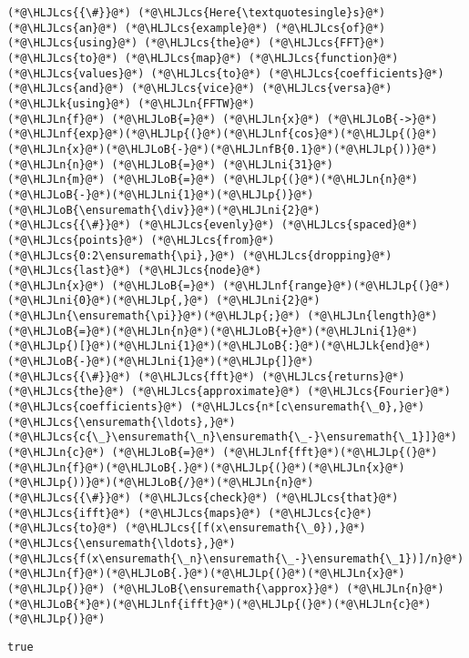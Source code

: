 \documentclass[12pt,landscape]{article}
\newcommand{\HLJLk}[1]{\textcolor[RGB]{148,91,176}{\textbf{#1}}}
\newcommand{\HLJLn}[1]{#1}
\newcommand{\HLJLnf}[1]{\textcolor[RGB]{66,102,213}{#1}}
\newcommand{\HLJLnfB}[1]{\textcolor[RGB]{59,151,46}{#1}}
\newcommand{\HLJLni}[1]{\textcolor[RGB]{59,151,46}{#1}}
\newcommand{\HLJLoB}[1]{\textcolor[RGB]{102,102,102}{\textbf{#1}}}
\newcommand{\HLJLp}[1]{#1}
\newcommand{\HLJLcs}[1]{\textcolor[RGB]{153,153,119}{\textit{#1}}}
\begin{document}
{\begin{lstlisting}
(*@\HLJLcs{{\#}}@*) (*@\HLJLcs{Here{\textquotesingle}s}@*) (*@\HLJLcs{an}@*) (*@\HLJLcs{example}@*) (*@\HLJLcs{of}@*) (*@\HLJLcs{using}@*) (*@\HLJLcs{the}@*) (*@\HLJLcs{FFT}@*) (*@\HLJLcs{to}@*) (*@\HLJLcs{map}@*) (*@\HLJLcs{function}@*) (*@\HLJLcs{values}@*) (*@\HLJLcs{to}@*) (*@\HLJLcs{coefficients}@*) (*@\HLJLcs{and}@*) (*@\HLJLcs{vice}@*) (*@\HLJLcs{versa}@*)
(*@\HLJLk{using}@*) (*@\HLJLn{FFTW}@*)
(*@\HLJLn{f}@*) (*@\HLJLoB{=}@*) (*@\HLJLn{x}@*) (*@\HLJLoB{->}@*) (*@\HLJLnf{exp}@*)(*@\HLJLp{(}@*)(*@\HLJLnf{cos}@*)(*@\HLJLp{(}@*)(*@\HLJLn{x}@*)(*@\HLJLoB{-}@*)(*@\HLJLnfB{0.1}@*)(*@\HLJLp{))}@*)
(*@\HLJLn{n}@*) (*@\HLJLoB{=}@*) (*@\HLJLni{31}@*)
(*@\HLJLn{m}@*) (*@\HLJLoB{=}@*) (*@\HLJLp{(}@*)(*@\HLJLn{n}@*)(*@\HLJLoB{-}@*)(*@\HLJLni{1}@*)(*@\HLJLp{)}@*)(*@\HLJLoB{\ensuremath{\div}}@*)(*@\HLJLni{2}@*)
(*@\HLJLcs{{\#}}@*) (*@\HLJLcs{evenly}@*) (*@\HLJLcs{spaced}@*) (*@\HLJLcs{points}@*) (*@\HLJLcs{from}@*) (*@\HLJLcs{0:2\ensuremath{\pi},}@*) (*@\HLJLcs{dropping}@*) (*@\HLJLcs{last}@*) (*@\HLJLcs{node}@*)
(*@\HLJLn{x}@*) (*@\HLJLoB{=}@*) (*@\HLJLnf{range}@*)(*@\HLJLp{(}@*)(*@\HLJLni{0}@*)(*@\HLJLp{,}@*) (*@\HLJLni{2}@*)(*@\HLJLn{\ensuremath{\pi}}@*)(*@\HLJLp{;}@*) (*@\HLJLn{length}@*)(*@\HLJLoB{=}@*)(*@\HLJLn{n}@*)(*@\HLJLoB{+}@*)(*@\HLJLni{1}@*)(*@\HLJLp{)[}@*)(*@\HLJLni{1}@*)(*@\HLJLoB{:}@*)(*@\HLJLk{end}@*)(*@\HLJLoB{-}@*)(*@\HLJLni{1}@*)(*@\HLJLp{]}@*)
(*@\HLJLcs{{\#}}@*) (*@\HLJLcs{fft}@*) (*@\HLJLcs{returns}@*) (*@\HLJLcs{the}@*) (*@\HLJLcs{approximate}@*) (*@\HLJLcs{Fourier}@*) (*@\HLJLcs{coefficients}@*) (*@\HLJLcs{n*[c\ensuremath{\_0},}@*) (*@\HLJLcs{\ensuremath{\ldots},}@*) (*@\HLJLcs{c{\_}\ensuremath{\_n}\ensuremath{\_-}\ensuremath{\_1}]}@*)
(*@\HLJLn{c}@*) (*@\HLJLoB{=}@*) (*@\HLJLnf{fft}@*)(*@\HLJLp{(}@*)(*@\HLJLn{f}@*)(*@\HLJLoB{.}@*)(*@\HLJLp{(}@*)(*@\HLJLn{x}@*)(*@\HLJLp{))}@*)(*@\HLJLoB{/}@*)(*@\HLJLn{n}@*)
(*@\HLJLcs{{\#}}@*) (*@\HLJLcs{check}@*) (*@\HLJLcs{that}@*) (*@\HLJLcs{ifft}@*) (*@\HLJLcs{maps}@*) (*@\HLJLcs{c}@*) (*@\HLJLcs{to}@*) (*@\HLJLcs{[f(x\ensuremath{\_0}),}@*) (*@\HLJLcs{\ensuremath{\ldots},}@*) (*@\HLJLcs{f(x\ensuremath{\_n}\ensuremath{\_-}\ensuremath{\_1})]/n}@*)
(*@\HLJLn{f}@*)(*@\HLJLoB{.}@*)(*@\HLJLp{(}@*)(*@\HLJLn{x}@*)(*@\HLJLp{)}@*) (*@\HLJLoB{\ensuremath{\approx}}@*) (*@\HLJLn{n}@*)(*@\HLJLoB{*}@*)(*@\HLJLnf{ifft}@*)(*@\HLJLp{(}@*)(*@\HLJLn{c}@*)(*@\HLJLp{)}@*)
\end{lstlisting}

\begin{lstlisting}
true
\end{lstlisting}


}
\end{document}
